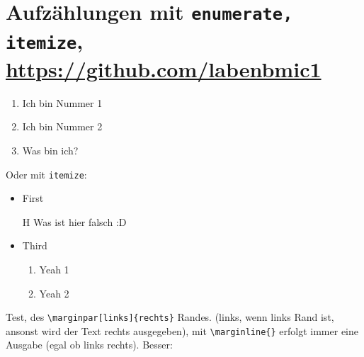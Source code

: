\chapter{Aufzählungen mit \texttt{enumerate, itemize}\texorpdfstring{, \url{https://github.com/labenbmic1}}{}}
\label{chap:Aufzaehlungen}
\begin{enumerate}
\item Ich bin Nummer 1
\item Ich bin Nummer 2
\item Was bin ich?
\end{enumerate}
Oder mit \texttt{itemize}:
\begin{itemize}
\item First
\item[H] Was ist hier falsch :D
\item Third
	\begin{enumerate}
	\item Yeah 1
	\item Yeah 2
	\end{enumerate}
\end{itemize}
\lipsum[1-5] Test, des \verb|\marginpar[links]{rechts}| Randes. (links, wenn links Rand ist, ansonst wird der Text rechts ausgegeben), 
\lipsum[1-1] mit \verb|\marginline{}| erfolgt immer eine Ausgabe (egal ob links rechts). Besser: 

